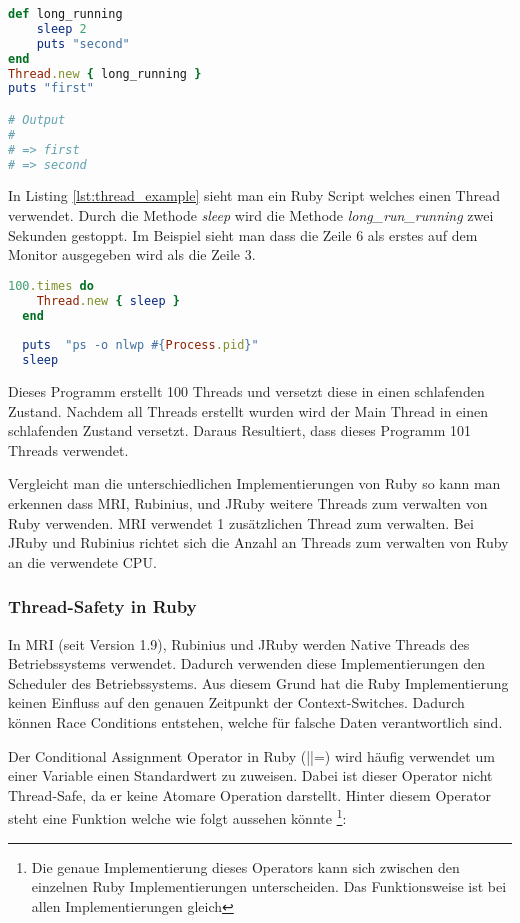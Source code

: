 \begin{lstlisting}[language=Ruby,label=lst:thread_example]
def long_running
	sleep 2
	puts "second"
end
Thread.new { long_running }
puts "first"

# Output
#
# => first
# => second

\end{lstlisting}

In Listing \ref{lst:thread_example} sieht man ein Ruby Script welches einen Thread verwendet. Durch die Methode \emph{sleep} wird die Methode \textit{long\_run\_running} zwei Sekunden gestoppt. Im Beispiel sieht man dass die Zeile 6 als erstes auf dem Monitor ausgegeben wird als die Zeile 3. 


\begin{lstlisting}[language=Ruby,caption=Adaptiert von \cite{Sto2013}]
  100.times do
    Thread.new { sleep }
  end
  
  puts  "ps -o nlwp #{Process.pid}"
  sleep
\end{lstlisting} 

Dieses Programm erstellt 100 Threads und versetzt diese in einen schlafenden Zustand. Nachdem all Threads erstellt wurden wird der Main Thread in einen schlafenden Zustand versetzt. Daraus Resultiert, dass dieses Programm 101 Threads verwendet. 

Vergleicht man die unterschiedlichen Implementierungen von Ruby so kann man erkennen dass MRI, Rubinius, und JRuby weitere Threads zum verwalten von Ruby verwenden. MRI verwendet 1 zusätzlichen Thread zum verwalten. Bei JRuby und Rubinius richtet sich die Anzahl an Threads zum verwalten von Ruby an die verwendete CPU.

\subsubsection{Thread-Safety in Ruby}
In MRI (seit Version 1.9), Rubinius und JRuby werden Native Threads des Betriebssystems verwendet. Dadurch verwenden diese Implementierungen den Scheduler des Betriebssystems. Aus diesem Grund hat die Ruby Implementierung keinen Einfluss auf den genauen Zeitpunkt der Context-Switches. Dadurch können Race Conditions entstehen, welche für falsche Daten verantwortlich sind.

Der Conditional Assignment Operator in Ruby (||=) wird häufig verwendet um einer Variable einen Standardwert zu zuweisen. Dabei ist dieser Operator nicht Thread-Safe, da er keine Atomare Operation darstellt. Hinter diesem Operator steht eine Funktion welche wie folgt aussehen könnte \footnote{Die genaue Implementierung dieses Operators kann sich zwischen den einzelnen Ruby Implementierungen unterscheiden. Das Funktionsweise ist bei allen Implementierungen gleich}:



